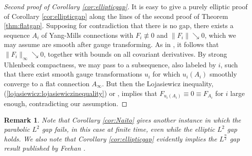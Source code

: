 \documentclass[12pt]{amsart}
\renewcommand{\1}{{\mathbf 1}}
\theoremstyle{others}
\newtheorem{rmk}[thm]{Remark}
\numberwithin{equation}{section}
\begin{document}
\begin{proof}[Second proof of Corollary \ref{cor:ellipticgap}]\label{ellipticgapsecondproof}
It is easy to give a purely elliptic proof of Corollary \ref{cor:ellipticgap} along the lines of the second proof of Theorem \ref{thm:flatgap}. Supposing for %
contradiction that there is no gap, there exists a sequence \(A_i\) of %
Yang-Mills connections with $F_i \not \equiv 0$ and \(\|F_i\| \searrow 0\), which we may assume are smooth after gauge transforming. As in \cite[Fact 2.2 and Lemma 3.1]{nakajimahigherdimensions}, it follows that \(\|F_i\|_\infty \searrow 0\), together with bounds on all covariant derivatives. By strong Uhlenbeck compactness, we may pass to a subsequence, also labeled by \(i\), such that there exist smooth gauge transformations \(u_i\) for which \(u_i(A_i)\) smoothly converge to a flat connection \(A_\infty\). But then the Lojasiewicz inequality, (\ref{lojasiewicz:lojasiewiczinequality}) or \cite[Lemma 12]{byanguniqueness}, implies that \(F_{u_i(A_i)} \equiv 0 \equiv F_{A_i} \) for \(i\) large enough, contradicting our assumption.
\end{proof}







\begin{rmk}\label{rmk:ellipticgap}
Note that Corollary \ref{cor:Naito} %
gives another instance in which the parabolic $L^2$ gap fails, in this case at finite time, even while the elliptic $L^2$ gap holds.
We also note that Corollary \ref{cor:ellipticgap} evidently implies the \(L^{\frac{n}{2}}\) gap result published by Feehan \cite{feehanflatgap}.
\end{rmk}

\end{document}
